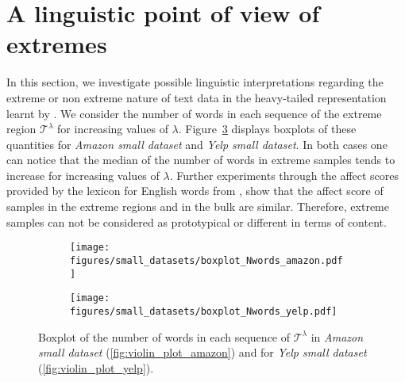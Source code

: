 \section{A linguistic point of view of extremes}\label{sec:linguistic_appendix}
In this section, we  investigate possible linguistic interpretations 
regarding the extreme or non extreme nature of text data in the heavy-tailed representation learnt by \HTalgo. 
We consider the number of words in each sequence of  the extreme region $\mathcal{T^\lambda}$ for increasing values of $\lambda$.  Figure~\ref{fig:violin_plot} displays boxplots of these quantities for 
\textit{Amazon small dataset} and \textit{Yelp small dataset}. In both cases one can notice that the median  of the number of words in extreme samples tends to increase  for increasing values of $\lambda$. 
Further experiments through the affect scores provided by the lexicon for English words from \cite{mohammad2017word}, show that the affect score of samples in the extreme regions and in the bulk are similar. Therefore, extreme samples can not be considered as prototypical or different in terms of content.
\begin{figure}[ht]
\begin{subfigure}[t]{0.49\textwidth}
    \texttt{[image: figures/small\_datasets/boxplot\_Nwords\_amazon.pdf]}
    \caption{}
    \label{fig:violin_plot_amazon}
    \end{subfigure}
\begin{subfigure}[t]{0.49\textwidth}

    \texttt{[image: figures/small\_datasets/boxplot\_Nwords\_yelp.pdf]}
    \caption{}
    \label{fig:violin_plot_yelp}
\end{subfigure}
\caption{Boxplot of the number of words in each sequence of $\mathcal{T}^\lambda$   in \textit{Amazon small dataset}  (\autoref{fig:violin_plot_amazon}) and for \textit{Yelp small dataset }  (\autoref{fig:violin_plot_yelp}). }
\label{fig:violin_plot}
\end{figure}
\fi
